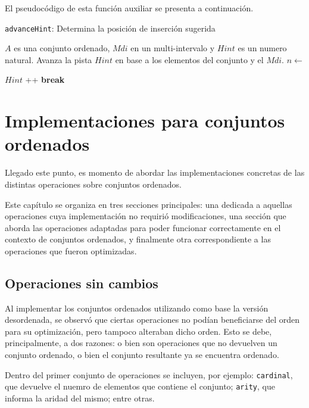 El pseudocódigo de esta función auxiliar se presenta a continuación.


\begin{algorithm}
\caption{\texttt{advanceHint}: Determina la posición de inserción sugerida}
\label{alg:advanceHint}
\begin{algorithmic}[1]
\Require $A$ es una conjunto ordenado, $Mdi$ en un multi-intervalo y $Hint$ es un numero natural.
\Ensure Avanza la pista $Hint$ en base a los elementos del conjunto y el $Mdi$.
    \State $n \gets$ 
    
            \State $Hint$ \!+\!+
        \Else
            \State \textbf{break}
        \EndIf
    \EndWhile
\EndFunction
\end{algorithmic}
\end{algorithm}



\chapter{Implementaciones para conjuntos ordenados}

Llegado este punto, es momento de abordar las implementaciones concretas de las distintas operaciones sobre conjuntos ordenados. 

Este capítulo se organiza en tres secciones principales: una dedicada a aquellas operaciones cuya implementación no requirió modificaciones, una sección que aborda las operaciones adaptadas para poder funcionar correctamente en el contexto de conjuntos ordenados, y finalmente otra correspondiente a las operaciones que fueron optimizadas.

\section{Operaciones sin cambios}

Al implementar los conjuntos ordenados utilizando como base la versión desordenada, se observó que ciertas operaciones no podían beneficiarse del orden para su optimización, pero tampoco alteraban dicho orden. Esto se debe, principalmente, a dos razones: o bien son operaciones que no devuelven un conjunto ordenado, o bien el conjunto resultante ya se encuentra ordenado.

Dentro del primer conjunto de operaciones se incluyen, por ejemplo: \texttt{cardinal}, que devuelve el nuemro de elementos que contiene el conjunto; \texttt{arity}, que informa la aridad del mismo; entre otras.

